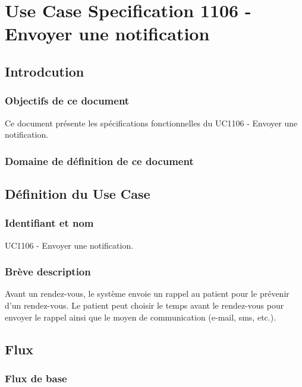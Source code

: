 \chapter{Use Case Specification 1106 - Envoyer une notification}

\section{Introdcution}

\subsection{Objectifs de ce document}

Ce document présente les spécifications fonctionnelles du UC1106 - Envoyer une notification.

\subsection{Domaine de définition de ce document}

\section{Définition du Use Case}

\subsection{Identifiant et nom}

UC1106 - Envoyer une notification.

\subsection{Brève description}

Avant un rendez-vous, le système envoie un rappel au patient pour le prévenir d'un rendez-vous.
Le patient peut choisir le temps avant le rendez-vous pour envoyer le rappel ainsi que le moyen
de communication (e-mail, sms, etc.).

\section{Flux}

\subsection{Flux de base}

